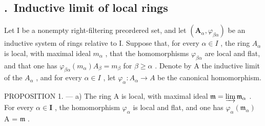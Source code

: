 \subsection*{\theappendixitem.\ Inductive limit of local rings}
{}

Let I be a nonempty right-filtering preordered set, and let \((\mathbf{A}_{\alpha}, \varphi_{\beta\alpha})\) be an inductive system of rings relative to I. Suppose that, for every \(\alpha \in I\) , the ring \(A_{\alpha}\) is local, with maximal ideal \(m_{\alpha}\) , that the homomorphisms \(\varphi_{\beta\alpha}\) are local and flat, and that one has \(\varphi_{\beta\alpha}(m_{\alpha}) A_{\beta} = m_{\beta}\) for \(\beta \geqslant \alpha\) . Denote by A the inductive limit of the \(A_{\alpha}\) , and for every \(\alpha \in I\) , let \(\varphi_{\alpha}: A_{\alpha} \to A\) be the canonical homomorphism.

PROPOSITION 1. --- a) The ring A is local, with maximal ideal \(\mathfrak{m} = \varinjlim \mathfrak{m}_{\alpha}\) . For every \(\alpha \in \mathbf{I}\) , the homomorphism \(\varphi_{\alpha}\) is local and flat, and one has \(\varphi_{\alpha}(\mathfrak{m}_{\alpha})\) A = \(\mathfrak{m}\) .

